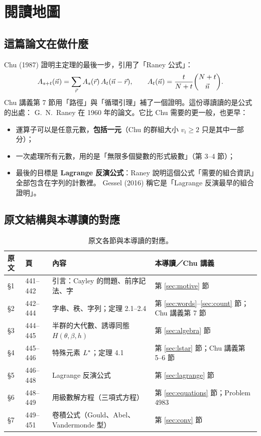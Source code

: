 \section{閱讀地圖}\label{sec:map}

\subsection{這篇論文在做什麼}

Chu (1987) 證明主定理的最後一步，引用了「Raney 公式」：
\[
A_{s+t}(\vec n)=\sum_{\vec r}A_s(\vec r)\,A_t(\vec n-\vec r),\qquad A_t(\vec n)=\frac{t}{N+t}\binom{N+t}{\vec n}.
\]
Chu 講義第 7 節用「路徑」與「循環引理」補了一個證明。這份導讀讀的是公式的出處：
G.~N.~Raney 在 1960 年的論文。它比 Chu 需要的更一般，也更早：
\begin{itemize}
  \item 運算子可以是任意元數，\textbf{包括一元}（Chu 的群組大小 $v_i\ge2$ 只是其中一部分）；
  \item 一次處理所有元數，用的是「無限多個變數的形式級數」（第 3--4 節）；
  \item 最後的目標是 \textbf{Lagrange 反演公式}：Raney 說明這個公式「需要的組合資訊」全部包含在字列的計數裡。
        Gessel (2016) 稱它是「Lagrange 反演最早的組合證明」。
\end{itemize}

\subsection{原文結構與本導讀的對應}

\begin{table}[H]
\centering
\small
\begin{tabular}{@{}llll@{}}
\toprule
原文 & 頁 & 內容 & 本導讀／Chu 講義\\
\midrule
§1 & 441--442 & 引言：Cayley 的問題、前序記法、字 & 第 \ref{sec:motive} 節\\
§2 & 442--444 & 字串、秩、字列；定理 2.1--2.4 & 第 \ref{sec:words}--\ref{sec:count} 節；Chu 講義第 7 節\\
§3 & 444--445 & 半群的大代數、誘導同態 $H(\theta,\beta,h)$ & 第 \ref{sec:algebra} 節\\
§4 & 445--446 & 特殊元素 $L^{*}$；定理 4.1 & 第 \ref{sec:lstar} 節；Chu 講義第 5--6 節\\
§5 & 446--448 & Lagrange 反演公式 & 第 \ref{sec:lagrange} 節\\
§6 & 448--449 & 用級數解方程（三項式方程） & 第 \ref{sec:equations} 節；Problem 4983\\
§7 & 449--451 & 卷積公式（Gould、Abel、Vandermonde 型） & 第 \ref{sec:conv} 節\\
\bottomrule
\end{tabular}
\caption{原文各節與本導讀的對應。}
\end{table}


